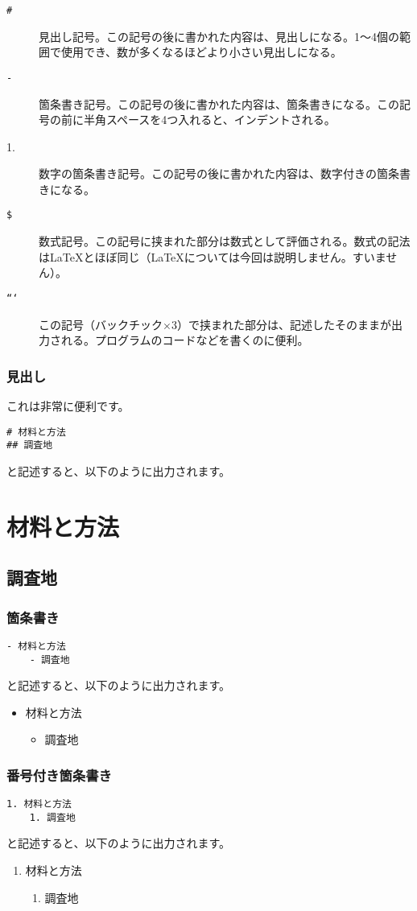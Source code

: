 \begin{description}
  \item[\texttt{\#}]見出し記号。この記号の後に書かれた内容は、見出しになる。1〜4個の範囲で使用でき、数が多くなるほどより小さい見出しになる。
  \item[\texttt{-}]箇条書き記号。この記号の後に書かれた内容は、箇条書きになる。この記号の前に半角スペースを4つ入れると、インデントされる。
  \item[1.]数字の箇条書き記号。この記号の後に書かれた内容は、数字付きの箇条書きになる。
  \item[\texttt{\$}]数式記号。この記号に挟まれた部分は数式として評価される。数式の記法は\LaTeX とほぼ同じ（\LaTeX については今回は説明しません。すいません）。
  \item[\texttt{```}]この記号（バックチック$\times$3）で挟まれた部分は、記述したそのままが出力される。プログラムのコードなどを書くのに便利。
\end{description}

    \subsubsection{見出し}
これは非常に便利です。
\begin{verbatim}
# 材料と方法
## 調査地
\end{verbatim}
と記述すると、以下のように出力されます。
\section*{材料と方法}
\subsection*{調査地}
    \subsubsection{箇条書き}
\begin{verbatim}
- 材料と方法
    - 調査地
\end{verbatim}
と記述すると、以下のように出力されます。
\begin{itemize}
  \item 材料と方法
  \begin{itemize}
  \item  調査地
  \end{itemize}
\end{itemize}

    \subsubsection{番号付き箇条書き}
\begin{verbatim}
1. 材料と方法
    1. 調査地
\end{verbatim}
と記述すると、以下のように出力されます。
\begin{enumerate}
  \item 材料と方法
  \begin{enumerate}
  \item  調査地
  \end{enumerate}
\end{enumerate}

